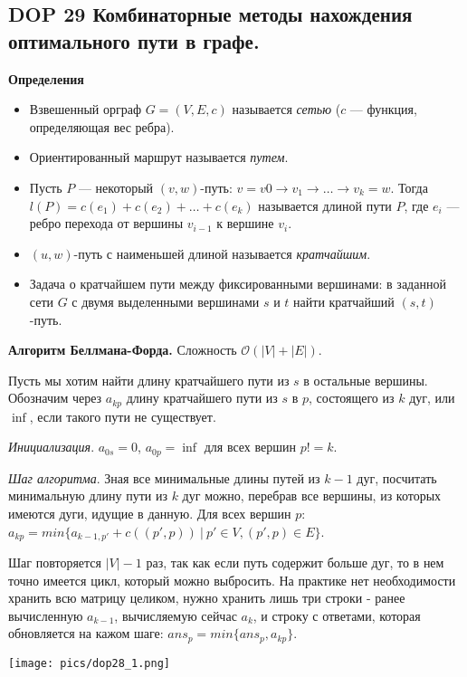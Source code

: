\subsection{DOP 29 Комбинаторные методы нахождения оптимального пути в графе.}

\textbf{Определения}

\begin{itemize}
    \item Взвешенный орграф $G = (V, E, c)$ называется \textit{сетью} ($c$ --- функция, определяющая вес ребра).
    \item Ориентированный маршрут называется \textit{путем}.
    \item Пусть $P$ --- некоторый $(v, w)$-путь: $v = v 0 \rightarrow v_1 \rightarrow \dots \rightarrow v_k = w$. Тогда $l(P) = c(e_1) + c(e_2) + \dots + c(e_k)$ называется длиной пути $P$, где $e_i$ --- ребро перехода от вершины $v_{i-1}$ к вершине $v_i$.
    \item $(u, w)$-путь с наименьшей длиной называется \textit{кратчайшим}.
    \item Задача о кратчайшем пути между фиксированными вершинами: в заданной сети $G$ с двумя выделенными вершинами $s$ и $t$ найти кратчайший $(s, t)$-путь.
\end{itemize}

\textbf{Алгоритм Беллмана-Форда.}
Сложность $\mathcal{O}(|V| + |E|)$.

Пусть мы хотим найти длину кратчайшего пути из $s$ в остальные вершины. Обозначим через $a_{kp}$ длину кратчайшего пути из $s$ в $p$, состоящего из $k$ дуг, или $\inf$, если такого пути не существует.

\textit{Инициализация}.
$a_{0s} = 0$, $a_{0p} = \inf$ для всех вершин $p != k$.

\textit{Шаг алгоритма}.
Зная все минимальные длины путей из $k-1$ дуг, посчитать минимальную длину пути из $k$ дуг можно, перебрав все вершины, из которых имеются дуги, идущие в данную. Для всех вершин $p$: $a_{kp} = min\{a_{k-1,p'} + c((p',p))~|~p' \in V, (p',p) \in E\}$.

Шаг повторяется $|V| - 1$ раз, так как если путь содержит больше дуг, то в нем точно имеется цикл, который можно выбросить. На практике нет необходимости хранить всю матрицу целиком, нужно хранить лишь три строки - ранее вычисленную $a_{k-1}$, вычисляемую сейчас $a_k$, и строку с ответами, которая обновляется на кажом шаге: $ans_p = min\{ans_p, a_{kp}\}$.

\texttt{[image: pics/dop28\_1.png]}

